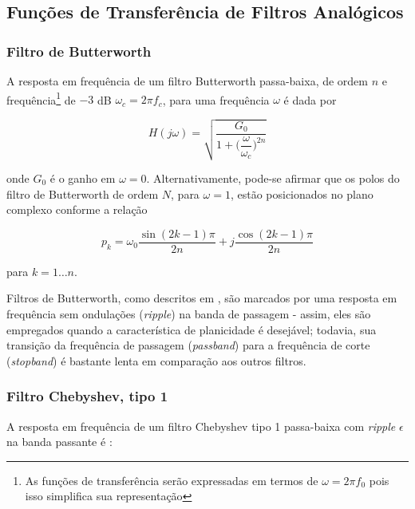 \subsection{Funções de Transferência de Filtros Analógicos}

\subsubsection{Filtro de Butterworth}
A resposta em frequência de um filtro Butterworth passa-baixa, de ordem $n$ e frequência\footnote{As funções de transferência serão expressadas em termos de $\omega = 2 \pi f_0$ pois isso simplifica sua representação} de $-3$ dB $\omega_c = 2 \pi f_c$, para uma frequência $\omega$ é dada por

\begin{equation}
H(j\omega) = \sqrt{\frac{G_0}{1 + {(\dfrac{\omega}{\omega_c}})^{2n}}}
\label{eq:butterworth_tf}
\end{equation}

onde $G_0$ é o ganho em $\omega = 0$. Alternativamente, pode-se afirmar que os polos do filtro de Butterworth de ordem $N$, para $\omega = 1$, estão posicionados no plano complexo conforme a relação 

\begin{equation}
p_k = \omega_0 \frac{\sin{(2k-1)\pi}}{2n} + j \frac{\cos{(2k-1)\pi}}{2n}
\label{eq:butterworth_poles}
\end{equation}

para $k = 1 \dots n$. 

Filtros de Butterworth, como descritos em \cite{butterworth}, são marcados por uma resposta em frequência sem ondulações (\textit{ripple}) na banda de passagem - assim, eles são empregados quando a característica de planicidade é desejável; todavia, sua transição da frequência de passagem (\textit{passband}) para a frequência de corte (\textit{stopband}) é bastante lenta em comparação aos outros filtros. 


\newpage

\subsubsection{Filtro Chebyshev, tipo 1}
A resposta em frequência de um filtro Chebyshev tipo 1 passa-baixa com \textit{ripple} $\epsilon$ na banda passante é \cite{sedra_smith}:

